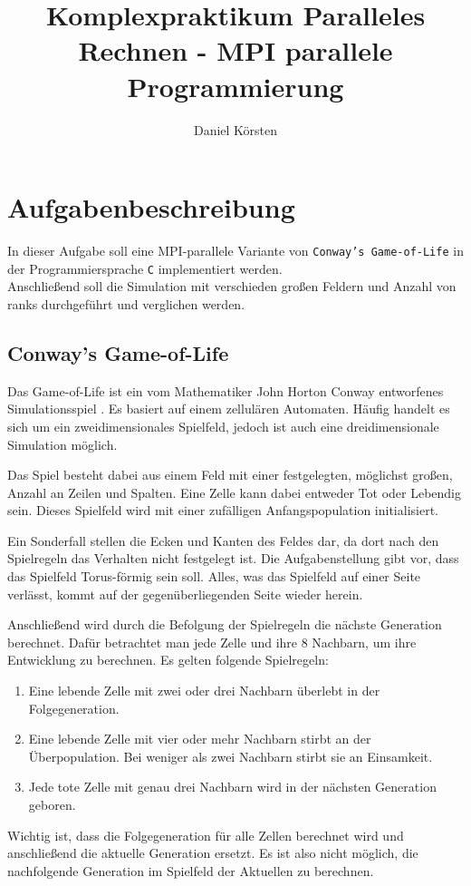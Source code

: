 \documentclass[german,plainarticle,hyperref,utf8]{zihpub}
\author{Daniel Körsten}
\title{Komplexpraktikum Paralleles Rechnen - MPI parallele Programmierung}
\begin{document}
	\section{Aufgabenbeschreibung}
	In dieser Aufgabe soll eine MPI-parallele Variante von \texttt{Conway’s Game-of-Life} in der Programmiersprache \texttt{C} implementiert werden.\\
	Anschließend soll die Simulation mit verschieden großen Feldern und Anzahl von ranks durchgeführt und verglichen werden.
	
	\subsection{Conway’s Game-of-Life}
	Das Game-of-Life ist ein vom Mathematiker John Horton Conway entworfenes Simulationsspiel \cite{gardner}. Es basiert auf einem zellulären Automaten. Häufig handelt es sich um ein zweidimensionales Spielfeld, jedoch ist auch eine dreidimensionale Simulation möglich.
	
	Das Spiel besteht dabei aus einem Feld mit einer festgelegten, möglichst großen, Anzahl an Zeilen und Spalten. Eine Zelle kann dabei entweder Tot oder Lebendig sein. Dieses Spielfeld wird mit einer zufälligen Anfangspopulation initialisiert.
	
	Ein Sonderfall stellen die Ecken und Kanten des Feldes dar, da dort nach den Spielregeln das Verhalten nicht festgelegt ist. Die Aufgabenstellung gibt vor, dass das Spielfeld Torus-förmig sein soll. Alles, was das Spielfeld auf einer Seite verlässt, kommt auf der gegenüberliegenden Seite wieder herein.
	
	Anschließend wird durch die Befolgung der Spielregeln die nächste Generation berechnet. Dafür betrachtet man jede Zelle und ihre 8 Nachbarn, um ihre Entwicklung zu berechnen. Es gelten folgende Spielregeln:
	\begin{enumerate}
		\item Eine lebende Zelle mit zwei oder drei Nachbarn überlebt in der Folgegeneration.
		\item Eine lebende Zelle mit vier oder mehr Nachbarn stirbt an der Überpopulation. Bei weniger als zwei Nachbarn stirbt sie an Einsamkeit.
		\item Jede tote Zelle mit genau drei Nachbarn wird in der nächsten Generation geboren.
	\end{enumerate}
	Wichtig ist, dass die Folgegeneration für alle Zellen berechnet wird und anschließend die aktuelle Generation ersetzt. Es ist also nicht möglich, die nachfolgende Generation im Spielfeld der Aktuellen zu berechnen.
	
\end{document}
